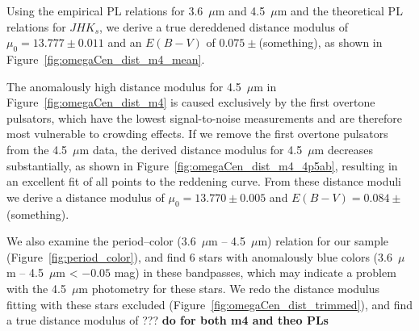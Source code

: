 \documentclass[a4paper,fleqn,usenatbib]{mnras}
\begin{document}


Using the empirical PL relations for 3.6~$\mu$m and 4.5~$\mu$m and the theoretical PL relations for $J\!H\!K_s$, we derive a true dereddened distance modulus of $\mu_0 = 13.777 \pm 0.011$ and an $E(B-V)$ of $0.075 \pm $(something), as shown in Figure~\ref{fig:omegaCen_dist_m4_mean}.

The anomalously high distance modulus for 4.5~$\mu$m in Figure~\ref{fig:omegaCen_dist_m4} is caused exclusively by the first overtone pulsators, which have the lowest signal-to-noise measurements and are therefore most vulnerable to crowding effects. If we remove the first overtone pulsators from the 4.5~$\mu$m data, the derived distance modulus for 4.5~$\mu$m decreases substantially, as shown in Figure~\ref{fig:omegaCen_dist_m4_4p5ab}, resulting in an excellent fit of all points to the reddening curve. From these distance moduli we derive a distance modulus of $\mu_0 = 13.770 \pm 0.005$ and $E(B-V) = 0.084 \pm$(something).

We also examine the period--color (3.6~$\mu$m -- 4.5~$\mu$m) relation for our sample (Figure~\ref{fig:period_color}), and find 6 stars with anomalously blue colors (3.6~$\mu$m -- 4.5~$\mu$m < $-0.05$ mag) in these bandpasses, which may indicate a problem with the 4.5~$\mu$m photometry for these stars. We redo the distance modulus fitting with these stars excluded (Figure~\ref{fig:omegaCen_dist_trimmed}), and find a true distance modulus of ??? {\bf do for both m4 and theo PLs}
\end{document}
